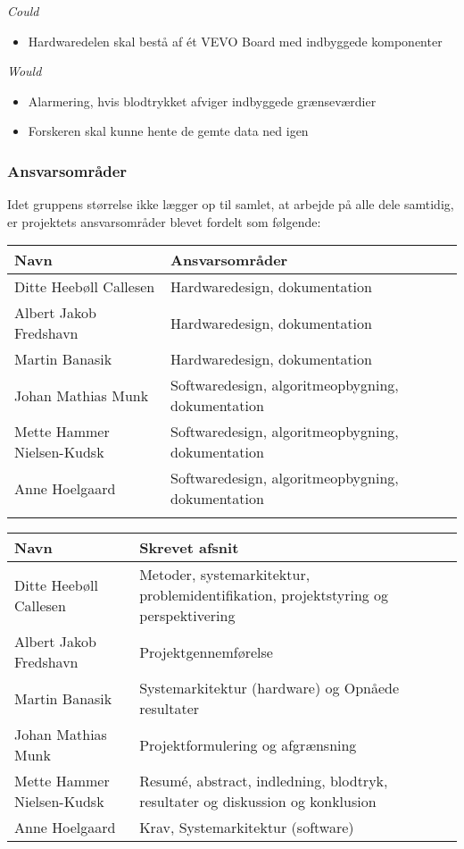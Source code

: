 \textit{Could}
\begin{itemize}
\item Hardwaredelen skal bestå af ét VEVO Board med indbyggede komponenter

\end{itemize} 
\textit{Would}
\begin{itemize}
\item Alarmering, hvis blodtrykket afviger indbyggede grænseværdier
\item Forskeren skal kunne hente de gemte data ned igen
\end{itemize}

\subsubsection{Ansvarsområder}

Idet gruppens størrelse ikke lægger op til samlet, at arbejde på alle dele samtidig, er projektets ansvarsområder blevet fordelt som følgende:

\begin{longtabu} to 
    Navn &    Ansvarsområder &    \\[-1ex]
    \midrule
    Ditte Heebøll Callesen &   Hardwaredesign, dokumentation	&    \\
    Albert Jakob Fredshavn &   Hardwaredesign, dokumentation	&    \\
    Martin Banasik         &   Hardwaredesign, dokumentation	&    \\
    Johan Mathias Munk     &   Softwaredesign, algoritmeopbygning, dokumentation &    \\
    Mette Hammer Nielsen-Kudsk &   Softwaredesign, algoritmeopbygning, dokumentation &    \\
   	Anne Hoelgaard    &   Softwaredesign, algoritmeopbygning, dokumentation	&    \\
\label{version_Systemark}
\end{longtabu}

\begin{longtabu} to 
    Navn &    Skrevet afsnit \\%
    \midrule
    Ditte Heebøll Callesen & Metoder, systemarkitektur, problemidentifikation, projektstyring og perspektivering \\
    Albert Jakob Fredshavn &  Projektgennemførelse \\
    Martin Banasik         & Systemarkitektur (hardware) og Opnåede resultater \\
    Johan Mathias Munk     & Projektformulering og afgrænsning  \\
    Mette Hammer Nielsen-Kudsk & Resumé, abstract, indledning, blodtryk, resultater og diskussion og konklusion  \\
   	Anne Hoelgaard   	 	& Krav, Systemarkitektur (software) \\
\end{longtabu}

